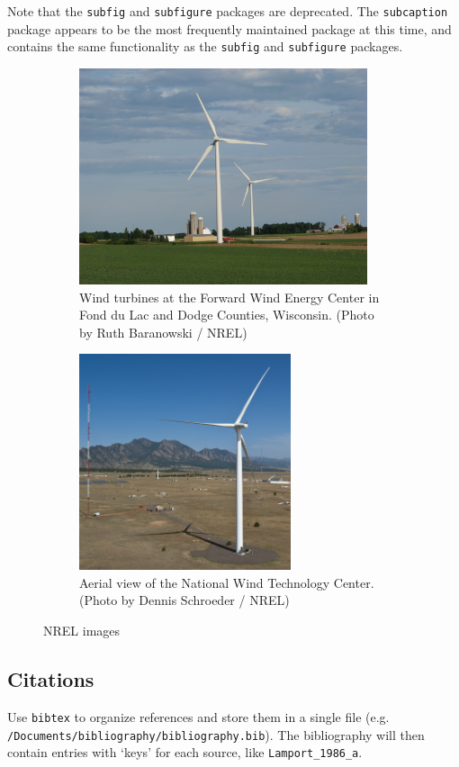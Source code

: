 Note that the \texttt{subfig} and \texttt{subfigure} packages are deprecated. The \texttt{subcaption} package appears to be the most frequently maintained package at this time, and contains the same functionality as the \texttt{subfig} and \texttt{subfigure} packages.

\begin{figure}
          \begin{subfigure}[b]{.55\linewidth}
            \centering
            \includegraphics[height=2.5in]{files/21206}
            \caption{Wind turbines at the Forward Wind Energy Center in Fond du Lac and Dodge Counties, Wisconsin. (Photo by Ruth Baranowski / NREL)}\label{fig:21206}
          \end{subfigure}%
          \begin{subfigure}[b]{.55\linewidth}
            \centering
            \includegraphics[height=2.5in]{files/20018}
            \caption{Aerial view of the National Wind Technology Center. (Photo by Dennis Schroeder / NREL)}\label{fig:20018}
          \end{subfigure}
          \caption{NREL images}\label{fig:NRELimages}
\end{figure}

\subsection{Citations}
\label{Sec:Bib}
Use \texttt{bibtex} to organize references and store them in a single file (e.g. \verb+/Documents/bibliography/bibliography.bib+). The bibliography will then contain entries with `keys' for each source, like \texttt{Lamport\_1986\_a}. 

